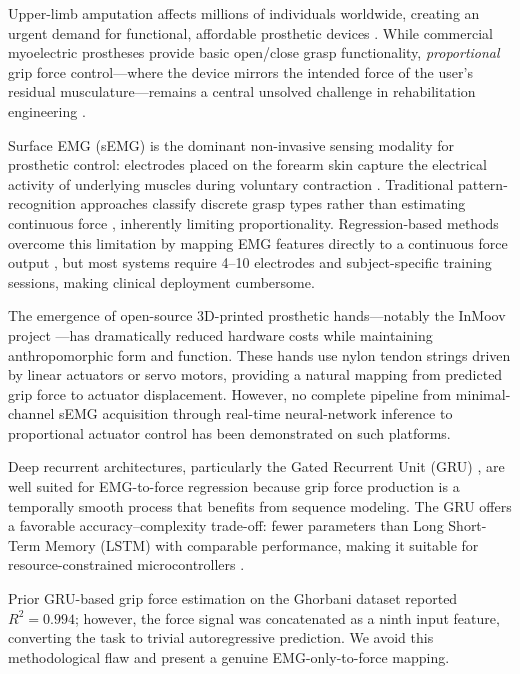 \documentclass[journal]{IEEEtran}
\begin{document}
Upper-limb amputation affects millions of individuals worldwide,
creating an urgent demand for functional, affordable prosthetic devices
\cite{scheme2011electromyogram}.  While commercial myoelectric prostheses
provide basic open/close grasp functionality, \emph{proportional} grip
force control---where the device mirrors the intended force of the user's
residual musculature---remains a central unsolved challenge in
rehabilitation engineering
\cite{castellini2009surface,li2019review,meattini2018semg}.

Surface EMG (sEMG) is the dominant non-invasive sensing modality for
prosthetic control: electrodes placed on the forearm skin capture the
electrical activity of underlying muscles during voluntary contraction
\cite{deluca1997use,basmajian1985muscles}.  Traditional pattern-recognition
approaches classify discrete grasp types rather than estimating continuous
force \cite{englehart2003robust}, inherently limiting proportionality.
Regression-based methods overcome this limitation by mapping EMG features
directly to a continuous force output \cite{hahne2014linear}, but most
systems require 4--10 electrodes and subject-specific training sessions,
making clinical deployment cumbersome.

The emergence of open-source 3D-printed prosthetic hands---notably the
InMoov project \cite{langevin2017inmoov}---has dramatically reduced
hardware costs while maintaining anthropomorphic form and function.  These
hands use nylon tendon strings driven by linear actuators or servo motors,
providing a natural mapping from predicted grip force to actuator
displacement.  However, no complete pipeline from minimal-channel sEMG
acquisition through real-time neural-network inference to proportional
actuator control has been demonstrated on such platforms.

Deep recurrent architectures, particularly the Gated Recurrent Unit (GRU)
\cite{cho2014learning}, are well suited for EMG-to-force regression because
grip force production is a temporally smooth process that benefits from
sequence modeling.  The GRU offers a favorable accuracy--complexity
trade-off: fewer parameters than Long Short-Term Memory (LSTM)
\cite{hochreiter1997lstm} with comparable performance, making it suitable
for resource-constrained microcontrollers \cite{warden2019tinyml}.

Prior GRU-based grip force estimation on the Ghorbani dataset
\cite{ghorbani2023estimation} reported $R^2 = 0.994$; however, the force
signal was concatenated as a ninth input feature, converting the task to
trivial autoregressive prediction.  We avoid this methodological flaw and
present a genuine EMG-only-to-force mapping.
\end{document}

